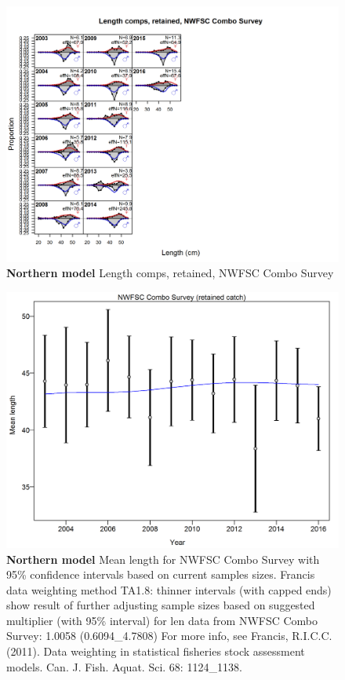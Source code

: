 \documentclass[12pt,]{article}
\begin{document}
\begin{figure}[htbp]
\centering
\includegraphics{./r4ss/plots_mod1/comp_lenfit_flt6mkt2.png}
\caption{\textbf{Northern model} Length comps, retained, NWFSC Combo
Survey \label{fig:mod1_26_comp_lenfit_flt6mkt2}}
\end{figure}

\begin{figure}[htbp]
\centering
\includegraphics{./r4ss/plots_mod1/comp_lenfit_data_weighting_TA1.8_NWFSC Combo Survey.png}
\caption{\textbf{Northern model} Mean length for NWFSC Combo Survey with
95\% confidence intervals based on current samples sizes. Francis data
weighting method TA1.8: thinner intervals (with capped ends) show result
of further adjusting sample sizes based on suggested multiplier (with
95\% interval) for len data from NWFSC Combo Survey: 1.0058
(0.6094\_4.7808) For more info, see Francis, R.I.C.C. (2011). Data
weighting in statistical fisheries stock assessment models. Can. J.
Fish. Aquat. Sci. 68: 1124\_1138.
\label{fig:mod1_29_comp_lenfit_data_weighting_TA1.8_NWFSC Combo Survey}}
\end{figure}
\end{document}
